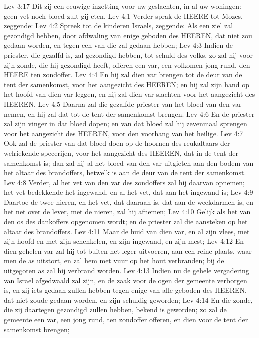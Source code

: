 Lev 3:17  Dit zij een eeuwige inzetting voor uw geslachten, in al uw woningen: geen vet noch bloed zult gij eten.
Lev 4:1  Verder sprak de HEERE tot Mozes, zeggende:
Lev 4:2  Spreek tot de kinderen Israels, zeggende: Als een ziel zal gezondigd hebben, door afdwaling van enige geboden des HEEREN, dat niet zou gedaan worden, en tegen een van die zal gedaan hebben;
Lev 4:3  Indien de priester, die gezalfd is, zal gezondigd hebben, tot schuld des volks, zo zal hij voor zijn zonde, die hij gezondigd heeft, offeren een var, een volkomen jong rund, den HEERE ten zondoffer.
Lev 4:4  En hij zal dien var brengen tot de deur van de tent der samenkomst, voor het aangezicht des HEEREN; en hij zal zijn hand op het hoofd van dien var leggen, en hij zal dien var slachten voor het aangezicht des HEEREN.
Lev 4:5  Daarna zal die gezalfde priester van het bloed van den var nemen, en hij zal dat tot de tent der samenkomst brengen.
Lev 4:6  En de priester zal zijn vinger in dat bloed dopen; en van dat bloed zal hij zevenmaal sprengen voor het aangezicht des HEEREN, voor den voorhang van het heilige.
Lev 4:7  Ook zal de priester van dat bloed doen op de hoornen des reukaltaars der welriekende specerijen, voor het aangezicht des HEEREN, dat in de tent der samenkomst is; dan zal hij al het bloed van den var uitgieten aan den bodem van het altaar des brandoffers, hetwelk is aan de deur van de tent der samenkomst.
Lev 4:8  Verder, al het vet van den var des zondoffers zal hij daarvan opnemen; het vet bedekkende het ingewand, en al het vet, dat aan het ingewand is;
Lev 4:9  Daartoe de twee nieren, en het vet, dat daaraan is, dat aan de weekdarmen is, en het net over de lever, met de nieren, zal hij afnemen;
Lev 4:10  Gelijk als het van den os des dankoffers opgenomen wordt; en de priester zal die aansteken op het altaar des brandoffers.
Lev 4:11  Maar de huid van dien var, en al zijn vlees, met zijn hoofd en met zijn schenkelen, en zijn ingewand, en zijn mest;
Lev 4:12  En dien gehelen var zal hij tot buiten het leger uitvoeren, aan een reine plaats, waar men de as uitstort, en zal hem met vuur op het hout verbranden; bij de uitgegoten as zal hij verbrand worden.
Lev 4:13  Indien nu de gehele vergadering van Israel afgedwaald zal zijn, en de zaak voor de ogen der gemeente verborgen is, en zij iets gedaan zullen hebben tegen enige van alle geboden des HEEREN, dat niet zoude gedaan worden, en zijn schuldig geworden;
Lev 4:14  En die zonde, die zij daartegen gezondigd zullen hebben, bekend is geworden; zo zal de gemeente een var, een jong rund, ten zondoffer offeren, en dien voor de tent der samenkomst brengen;
